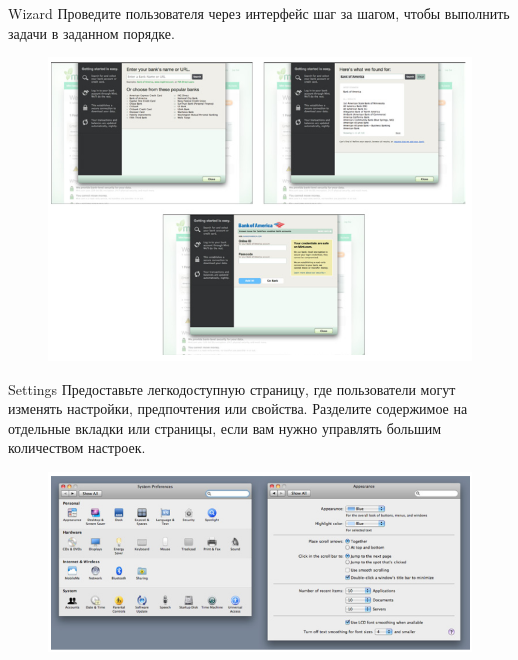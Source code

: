 \documentclass{beamer}
\begin{document}
\begin{frame}[t]{Wizard}
	Проведите пользователя через интерфейс шаг за шагом, чтобы выполнить задачи в заданном порядке.
	\begin{figure}[h]
		\centering
		\includegraphics[scale=0.5]{images/lec07-pic10.png}
	\end{figure}
\end{frame} 

\begin{frame}[t]{Settings}
	Предоставьте легкодоступную страницу, где пользователи могут изменять настройки,
предпочтения или свойства. Разделите содержимое на отдельные вкладки или страницы, если вам нужно управлять большим количеством настроек.
	\begin{figure}[h]
		\centering
		\includegraphics[scale=0.6]{images/lec07-pic11.png}
	\end{figure}
\end{frame} 
\end{document}
